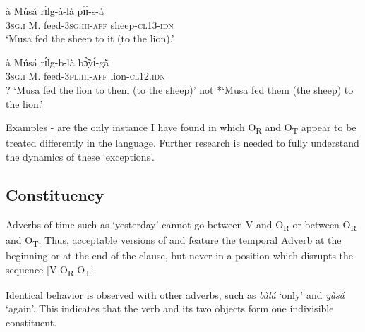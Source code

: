 \documentclass[output=paper]{langsci/langscibook}
\begin{document}
\ea
\label{ex:29.pacchiarotti}
\gll à    Músá    rɪ́lg-à-là    pɪ́ɪ́-s-á\\
\textsc{3sg.i}    M.    feed-\textsc{3sg.iii-aff}  sheep-\textsc{cl13-idn}\\
\glt `Musa fed the sheep to it (to the lion).'
\z

\ea
\label{ex:30.pacchiarotti}
\gll à    Músá  rɪ́lg-b-là     bɔ̃̀yɪ́-g\`{ã} \\
\textsc{3sg.i}    M.  feed-\textsc{3pl.iii-aff}    lion-\textsc{cl12.idn}\\
\glt
? `Musa fed the lion to them (to the sheep)' not *`Musa fed them (the sheep) to the lion.'  
\z

Examples - are the only instance I have found in which O\textsubscript{R} and O\textsubscript{T} appear to be treated differently in the language. Further research is needed to fully understand the dynamics of these `exceptions'.

\subsection{Constituency}\label{§4.5:constituency.pacchiarotti}

Adverbs of time such as `yesterday' cannot go between V and O\textsubscript{R} or between O\textsubscript{R} and O\textsubscript{T}. Thus, acceptable versions of  and  feature the temporal Adverb at the beginning or at the end of the clause, but never in a position which disrupts the sequence [V O\textsubscript{R} O\textsubscript{T}].

\z

\z

Identical behavior is observed with other adverbs, such as \textit{bàlá} `only' and \textit{yàsá} `again'. This indicates that the verb and its two objects form one indivisible constituent.
\end{document}
